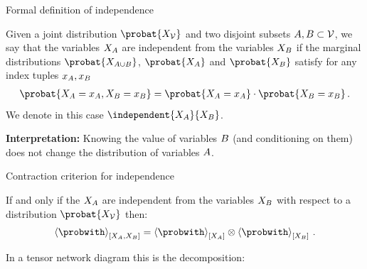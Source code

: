 \documentclass{beamer}
\begin{document}
    \begin{frame}{Formal definition of independence}

        \begin{definition}[Independence]
    	Given a joint distribution $\probat{\nodevariables}$ and two disjoint subsets $A,B\subset\mathcal{V}$, we say that the variables $X_{A}$ are independent from the variables $X_{B}$ if the marginal distributions $\probat{\catvariableof{\nodesa\cup\nodesb}}$, $\probat{\catvariableof{\nodesa}}$ and $\probat{\catvariableof{\nodesb}}$ satisfy for any index tuples $x_{A},x_{B}$
        \begin{align*}
            \probat{\indexedcatvariableof{\nodesa},\indexedcatvariableof{\nodesb}}
            = \probat{\indexedcatvariableof{\nodesa}}
            \cdot
            \probat{\indexedcatvariableof{\nodesb}} \, .
        \end{align*}
        We denote in this case $\independent{\catvariableof{\nodesa}}{\catvariableof{\nodesb}}$.
        \end{definition}

            {\bf Interpretation:} Knowing the value of variables $B$ (and conditioning on them) does not change the distribution of variables $A$.

    \end{frame}


    \begin{frame}{Contraction criterion for independence}

        \begin{theorem}\label{the:independenceProductCriterion}
            If and only if the $X_{A}$ are independent from the variables $X_{B}$  with respect to a distribution $\probat{\nodevariables}$ then:
            \begin{align*}
                \contractionof{\probwith}{\catvariableof{\nodesa},\catvariableof{\nodesb}}
                = %
                \contractionof{\probwith}{\catvariableof{\nodesa}}
                \otimes
                \contractionof{\probwith}{\catvariableof{\nodesb}}
                \, .
            \end{align*}
        \end{theorem}

        In a tensor network diagram this is the decomposition:
        
    \end{frame}
\end{document}
